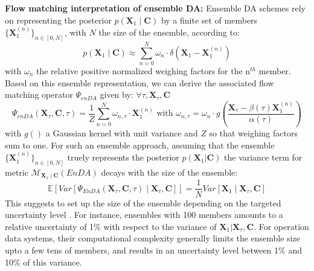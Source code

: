 \documentclass[10pt]{article}
\begin{document}
{\bf Flow matching interpretation of ensemble DA:} Ensemble DA schemes rely on representing the posterior $p(\mathbf{X}_1 \mid \mathbf{C})$ by a finite set of members $\{\mathbf{X}^{(n)}_1 \}_{n\in[0,N]}$, with $N$ the size of the ensemble, according to:
\begin{equation}
    \label{eq: enDA cfm}
    p(\mathbf{X}_1 \mid \mathbf{C}) \approx \sum_{n=0}^N
    \omega_n \cdot \delta \left( \mathbf{X}_1 - \mathbf{X}^{(n)}_1
    \right ) 
\end{equation}
with $\omega_n$ the relative positive normalized weighing factors for the n$^{th}$ member. Based on this ensemble representation, we can derive the associated flow matching operator $\Psi_{enDA}$ given by: $\forall \tau, \mathbf{X}_\tau, \mathbf{C}$
\begin{equation}
    \label{eq: enDA cfm}
    \Psi_{enDA}\left (\mathbf{X}_\tau, \mathbf{C},\tau \right ) = \frac{1}{Z}
     \sum_{n=0}^N
    \omega_{n,\tau} \cdot \mathbf{X}^{(n)}_1 
    \mbox{  with } \omega_{n,\tau} = \omega_{n} \cdot g \left ( \frac{\mathbf{X}_\tau - \beta(\tau)\mathbf{X}^{(n)}_1}{\alpha(\tau)} \right )
\end{equation}
with ${g}()$ a Gaussian kernel with unit variance and $Z$ so that weighing factors sum to one. For such an ensemble approach, assuming that the ensemble $\{\mathbf{X}^{(n)}_1 \}_{n\in[0,N]}$ truely represents the posterior $p(\mathbf{X}_1 | \mathbf{C})$ the variance term for metric $\mathcal{M}_{\mathbf{X}_1\mid \mathbf{C}}\left( EnDA \right)$ decays with the size of the ensemble:
\begin{equation}
    \mathbb{E} \left [Var \left [  \Psi_{EnDA}\left (\mathbf{X}_\tau, \mathbf{C},\tau \right ) \mid \mathbf{X}_\tau,\mathbf{C} \right ] \right ] 
    = \frac{1}{N} Var\left[ \mathbf{X}_1 \mid \mathbf{X}_\tau,\mathbf{C} \right ]
\end{equation}
This suggests to set up the size of the ensemble depending on the targeted uncertainty level \cite{carrassi_data_2018}. For instance, ensembles with 100 members amounts to a relative uncertainty of 1\% with respect to the variance of $\mathbf{X}_1 | \mathbf{X}_\tau,\mathbf{C}$. For operation data systems, their computational complexity generally  limits the ensemble size upto  a few tens of members, and results in an uncertainty level between 1\% and 10\% of this variance.
\end{document}
